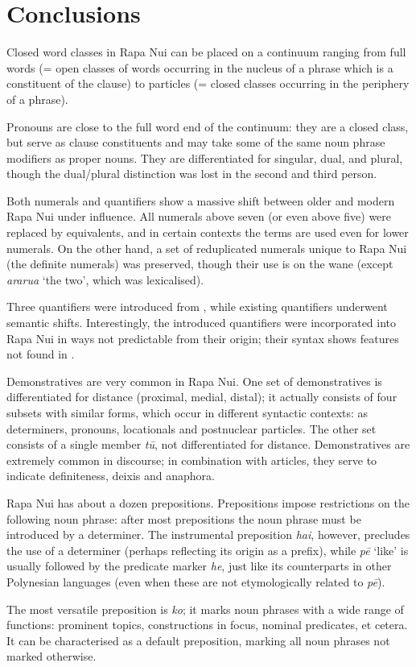 \section{Conclusions}\label{sec:4.8}

Closed word classes in Rapa Nui can be placed on a continuum ranging from full words (= open classes of words occurring in the nucleus of a phrase which is a constituent of the clause) to particles (= closed classes occurring in the periphery of a phrase). 

Pronouns are close to the full word end of the continuum: they are a closed class, but serve as clause constituents and may take some of the same noun phrase modifiers as proper nouns. They are differentiated for singular, dual, and plural, though the dual/plural distinction was lost in the second and third person.

Both numerals and quantifiers show a massive shift between older and modern Rapa Nui under  influence. All numerals above seven (or even above five) were replaced by  equivalents, and in certain contexts the  terms are used even for lower numerals. On the other hand, a set of reduplicated numerals unique to Rapa Nui (the definite numerals) was preserved, though their use is on the wane (except \textit{ararua} ‘the two’, which was lexicalised).

Three quantifiers were introduced from , while existing quantifiers underwent semantic shifts. Interestingly, the introduced quantifiers were incorporated into Rapa Nui in ways not predictable from their  origin; their syntax shows features not found in .

Demonstratives are very common in Rapa Nui. One set of demonstratives is differentiated for distance (proximal, medial, distal); it actually consists of four subsets with similar forms, which occur in different syntactic contexts: as determiners, pronouns, locationals and postnuclear particles. The other set consists of a single member \textit{tū}, not differentiated for distance. Demonstratives are extremely common in discourse; in combination with articles, they serve to indicate definiteness, deixis and anaphora.

Rapa Nui has about a dozen prepositions. Prepositions impose restrictions on the following noun phrase: after most prepositions the noun phrase must be introduced by a determiner. The instrumental preposition \textit{hai}, however, precludes the use of a determiner (perhaps reflecting its origin as a prefix), while \textit{pē} ‘like’ is usually followed by the predicate marker \textit{he}, just like its counterparts in other Polynesian languages (even when these are not etymologically related to \textit{pē}).

The most versatile preposition is \textit{ko}; it marks noun phrases with a wide range of functions: prominent topics, constructions in focus, nominal predicates, et cetera. It can be characterised as a default preposition, marking all noun phrases not marked otherwise.
